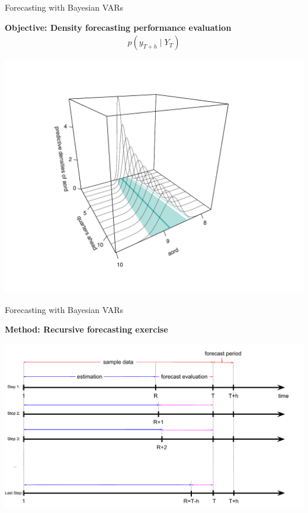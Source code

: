 \documentclass[notes,blackandwhite,mathsans]{beamer}
\begin{document}
\begin{frame}{Forecasting with Bayesian VARs}

\bigskip\textbf{Objective: Density forecasting performance evaluation}
\begin{align*}
p(y_{T+h}\mid Y_{T})
\end{align*}

\centering
\includegraphics[scale=0.4, trim=0cm 0cm 0cm 1cm]{grphs/06density}

\end{frame}




\begin{frame}{Forecasting with Bayesian VARs}

\centering
\bigskip\textbf{Method: Recursive forecasting exercise}

\bigskip
\includegraphics[scale=0.4]{grphs/06recursive}
\end{frame}
\end{document}
